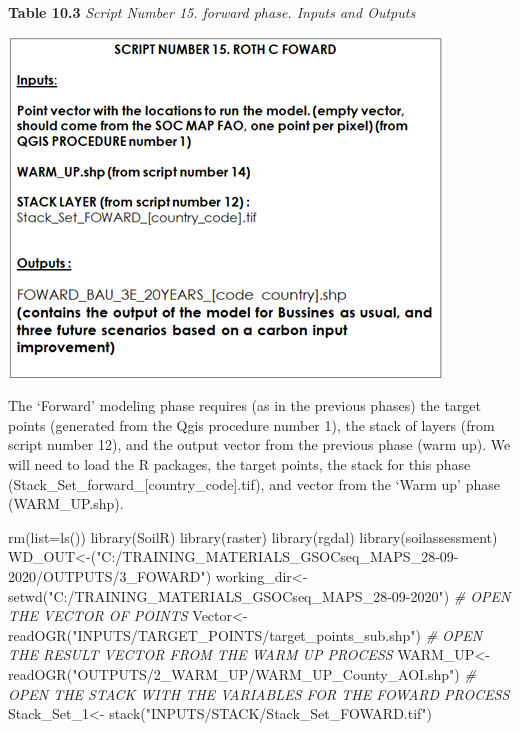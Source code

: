 \documentclass[
  10pt,
  b5paper,
]{book}
\newenvironment{Shaded}{\begin{snugshade}}{\end{snugshade}}
\newcommand{\AttributeTok}[1]{\textcolor[rgb]{0.77,0.63,0.00}{#1}}
\newcommand{\CommentTok}[1]{\textcolor[rgb]{0.56,0.35,0.01}{\textit{#1}}}
\newcommand{\FunctionTok}[1]{\textcolor[rgb]{0.00,0.00,0.00}{#1}}
\newcommand{\NormalTok}[1]{#1}
\newcommand{\OtherTok}[1]{\textcolor[rgb]{0.56,0.35,0.01}{#1}}
\newcommand{\StringTok}[1]{\textcolor[rgb]{0.31,0.60,0.02}{#1}}
\begin{document}
\textbf{Table 10.3} \emph{Script Number 15. forward phase. Inputs and Outputs}

\includegraphics{tables/Table_10.3.png}

The `Forward' modeling phase requires (as in the previous phases) the target points (generated from the Qgis procedure number 1), the stack of layers (from script number 12), and the output vector from the previous phase (warm up). We will need to load the R packages, the target points, the stack for this phase (Stack\_Set\_forward\_{[}country\_code{]}.tif), and vector from the `Warm up' phase (WARM\_UP.shp).

\begin{Shaded}
\begin{Highlighting}[]
\FunctionTok{rm}\NormalTok{(}\AttributeTok{list=}\FunctionTok{ls}\NormalTok{()) }
\FunctionTok{library}\NormalTok{(SoilR)}
\FunctionTok{library}\NormalTok{(raster)}
\FunctionTok{library}\NormalTok{(rgdal)}
\FunctionTok{library}\NormalTok{(soilassessment)}
\NormalTok{WD\_OUT}\OtherTok{\textless{}{-}}\NormalTok{(}\StringTok{"C:/TRAINING\_MATERIALS\_GSOCseq\_MAPS\_28{-}09{-}2020/OUTPUTS/3\_FOWARD"}\NormalTok{)}
\NormalTok{working\_dir}\OtherTok{\textless{}{-}}\FunctionTok{setwd}\NormalTok{(}\StringTok{"C:/TRAINING\_MATERIALS\_GSOCseq\_MAPS\_28{-}09{-}2020"}\NormalTok{)}
\CommentTok{\# OPEN THE VECTOR OF POINTS}
\NormalTok{Vector}\OtherTok{\textless{}{-}}\FunctionTok{readOGR}\NormalTok{(}\StringTok{"INPUTS/TARGET\_POINTS/target\_points\_sub.shp"}\NormalTok{)}
\CommentTok{\# OPEN THE RESULT VECTOR FROM THE WARM UP PROCESS}
\NormalTok{WARM\_UP}\OtherTok{\textless{}{-}}\FunctionTok{readOGR}\NormalTok{(}\StringTok{"OUTPUTS/2\_WARM\_UP/WARM\_UP\_County\_AOI.shp"}\NormalTok{)}
\CommentTok{\# OPEN THE STACK WITH THE VARIABLES FOR THE FOWARD PROCESS}
\NormalTok{Stack\_Set\_1}\OtherTok{\textless{}{-}} \FunctionTok{stack}\NormalTok{(}\StringTok{"INPUTS/STACK/Stack\_Set\_FOWARD.tif"}\NormalTok{)}
\end{Highlighting}
\end{Shaded}
\end{document}
